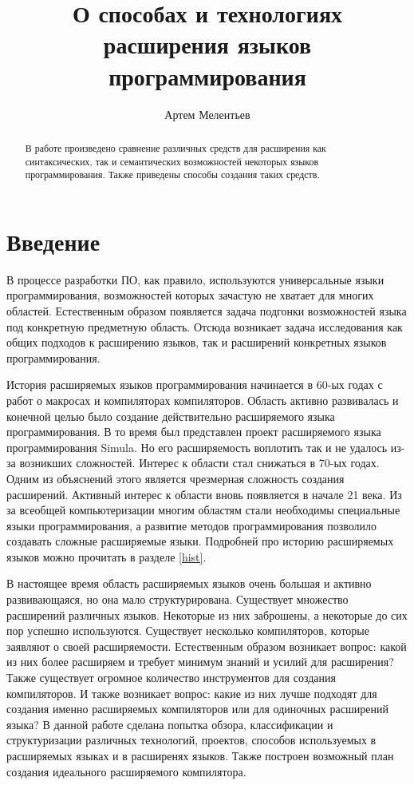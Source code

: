 \documentclass[a4paper,12pt]{article}
\begin{document}
\title{О способах и технологиях расширения языков программирования}
\author{Артем Мелентьев}
\maketitle

\begin{abstract}
В работе произведено сравнение различных средств для расширения как
синтаксических, так и семантических возможностей некоторых языков
программирования. Также приведены способы создания таких средств.
\end{abstract}

\tableofcontents

\pagebreak

\section{Введение}

В процессе разработки ПО, как правило, используются универсальные языки
программирования, возможностей которых зачастую не хватает для многих областей.
Естественным образом появляется задача подгонки возможностей языка под
конкретную предметную область. Отсюда возникает задача исследования как общих
подходов к расширению языков, так и расширений конкретных языков
программирования.

История расширяемых языков программирования начинается в 60-ых годах с работ о
макросах и компиляторах компиляторов. Область активно развивалась и конечной
целью было создание действительно расширяемого языка программирования. В
то время был представлен проект расширяемого языка программирования Simula. Но
его расширяемость воплотить так и не удалось из-за возникших сложностей.
Интерес к области стал снижаться в 70-ых годах. Одним из объяснений
этого является чрезмерная сложность создания расширений. Активный интерес к
области вновь появляется в начале 21 века. Из за всеобщей компьютеризации
многим областям стали необходимы специальные языки программирования, а развитие
методов программирования позволило создавать сложные расширяемые языки.
Подробней про историю расширяемых языков можно прочитать в разделе \ref{hist}.

В настоящее время область расширяемых языков очень большая и активно
развивающаяся, но она мало структурирована. Существует множество расширений
различных языков. Некоторые из них заброшены, а некоторые до сих пор успешно
используются. Существует несколько компиляторов, которые заявляют о своей
расширяемости. Естественным образом возникает вопрос: какой из них более
расширяем и требует минимум знаний и усилий для расширения? Также существует
огромное количество инструментов для создания компиляторов. И также возникает
вопрос: какие из них лучше подходят для создания именно расширяемых
компиляторов или для одиночных расширений языка? В данной работе сделана
попытка обзора, классификации и структуризации различных технологий, проектов,
способов используемых в расширяемых языках и в расширенях языков. Также
построен возможный план создания идеального расширяемого компилятора.
\end{document}
